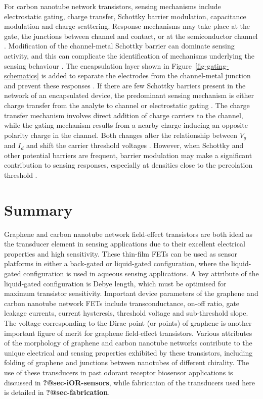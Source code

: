 \documentclass[
  a4paper,
]{scrbook}
\begin{document}
For carbon nanotube network transistors, sensing mechanisms include
electrostatic gating, charge transfer, Schottky barrier modulation,
capacitance modulation and charge scattering. Response mechanisms may
take place at the gate, the junctions between channel and contact, or at
the semiconductor channel
\autocite{Heller2008,Battie2011,Boyd2014,Tran2016,Li2023}. Modification
of the channel-metal Schottky barrier can dominate sensing activity, and
this can complicate the identification of mechanisms underlying the
sensing behaviour \autocite{Cao2009,Boyd2014,Schroeder2019}. The
encapsulation layer shown in Figure~\ref{fig-gating-schematics} is added
to separate the electrodes from the channel-metal junction and prevent
these responses \autocite{Heller2008,Shkodra2021}. If there are few
Schottky barriers present in the network of an encapsulated device, the
predominant sensing mechanism is either charge transfer from the analyte
to channel \autocite{Allen2007,Battie2011} or electrostatic gating
\autocite{Heller2008}. The charge transfer mechanism involves direct
addition of charge carriers to the channel, while the gating mechanism
results from a nearby charge inducing an opposite polarity charge in the
channel. Both changes alter the relationship between \(V_g\) and \(I_d\)
and shift the carrier threshold voltages
\autocite{Tran2016,Shkodra2021,Li2023}. However, when Schottky and other
potential barriers are frequent, barrier modulation may make a
significant contribution to sensing responses, especially at densities
close to the percolation threshold \autocite{Boyd2014,Murugathas2019a}.

\hypertarget{summary}{%
\section{Summary}\label{summary}}

Graphene and carbon nanotube network field-effect transistors are both
ideal as the transducer element in sensing applications due to their
excellent electrical properties and high sensitivity. These thin-film
FETs can be used as sensor platforms in either a back-gated or
liquid-gated configuration, where the liquid-gated configuration is used
in aqueous sensing applications. A key attribute of the liquid-gated
configuration is Debye length, which must be optimised for maximum
transistor sensitivity. Important device parameters of the graphene and
carbon nanotube network FETs include transconductance, on-off ratio,
gate leakage currents, current hysteresis, threshold voltage and
sub-threshold slope. The voltage corresponding to the Dirac point (or
points) of graphene is another important figure of merit for graphene
field-effect transistors. Various attributes of the morphology of
graphene and carbon nanotube networks contribute to the unique
electrical and sensing properties exhibited by these transistors,
including folding of graphene and junctions between nanotubes of
different chirality. The use of these transducers in past odorant
receptor biosensor applications is discussed in
\textbf{?@sec-iOR-sensors}, while fabrication of the transducers used
here is detailed in \textbf{?@sec-fabrication}.
\end{document}
